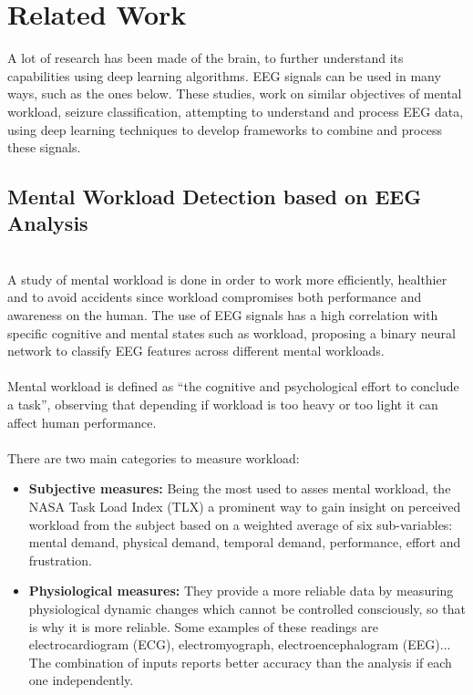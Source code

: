 \section{Related Work}
A lot of research has been made of the brain, to further understand its capabilities using deep learning algorithms. EEG signals can be used in many ways, such as the ones below. These studies, work on similar objectives of mental workload, seizure classification, attempting to understand and process EEG data, using deep learning techniques to develop frameworks to combine and process these signals.
\\
\subsection{Mental Workload Detection based on EEG Analysis}
\leavevmode\\ 
A study of mental workload\cite{relatedwork0} is done in order to work more efficiently, healthier and to avoid accidents since workload compromises both performance and awareness on the human. The use of EEG signals has a high correlation with specific cognitive and mental states such as workload, proposing a binary neural network to classify EEG features across different mental workloads.
\\\\
Mental workload is defined as “the cognitive and psychological effort to conclude a task”, observing that depending if workload is too heavy or too light it can affect human performance. 
\\\\
There are two main categories to measure workload:
\\
\begin{itemize}
\item \textbf{Subjective measures:} Being the most used to asses mental workload, the NASA Task Load Index (TLX)\cite{tlx} a prominent way to gain insight on perceived workload from the subject based on a weighted average of six sub-variables: mental demand, physical demand, temporal demand, performance, effort and frustration. 
\item \textbf{Physiological measures:} They provide a more reliable data by measuring physiological dynamic changes which cannot be controlled consciously, so that is why it is more reliable. Some examples of these readings are electrocardiogram (ECG), electromyograph, electroencephalogram (EEG)... The combination of inputs reports better accuracy than the analysis if each one independently.
\end{itemize}


